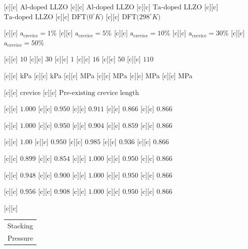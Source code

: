 [c][c] {$\text{Al-doped LLZO}$}
[c][c] {$\text{Al-doped LLZO}$}
[c][c] {$\text{Ta-doped LLZO}$}
[c][c] {$\text{Ta-doped LLZO}$}
[c][c] {$\text{DFT($0^{\circ}K$)}$}
[c][c] {$\text{DFT($298^{\circ}K$)}$}

[c][c] {$\text{a}_{\text{crevice}}\!=1\%$}
[c][c] {$\text{a}_{\text{crevice}}\!=5\%$}
[c][c] {$\text{a}_{\text{crevice}}\!=10\%$}
[c][c] {$\text{a}_{\text{crevice}}\!=30\%$}
[c][c] {$\text{a}_{\text{crevice}}\!=50\%$}

[c][c] {$10$}
[c][c] {$30$}
[c][c] {$1$}
[c][c] {$16$}
[c][c] {$50$}
[c][c] {$110$}

[c][c] {kPa}
[c][c] {kPa}
[c][c] {MPa}
[c][c] {MPa}
[c][c] {MPa}
[c][c] {MPa}

[c][c] {$\text{crevice}$}
[c][c] {$\text{Pre-existing crevice length}$}

[c][c] {$1.000$}
[c][c] {$0.950$}
[c][c] {$0.911$}
[c][c] {$0.866$}
[c][c] {$0.866$}

[c][c] {$1.000$}
[c][c] {$0.950$}
[c][c] {$0.904$}
[c][c] {$0.859$}
[c][c] {$0.866$}

[c][c] {$1.00$}
[c][c] {$0.950$}
[c][c] {$0.985$}
[c][c] {$0.936$}
[c][c] {$0.866$}

[c][c] {$0.899$}
[c][c] {$0.854$}
[c][c] {$1.000$}
[c][c] {$0.950$}
[c][c] {$0.866$}

[c][c] {$0.948$}
[c][c] {$0.900$}
[c][c] {$1.000$}
[c][c] {$0.950$}
[c][c] {$0.866$}

[c][c] {$0.956$}
[c][c] {$0.908$}
[c][c] {$1.000$}
[c][c] {$0.950$}
[c][c] {$0.866$}

[c][c] {\begin{tabular}{@{}c@{}} Stacking \\ Pressure \end{tabular}}


